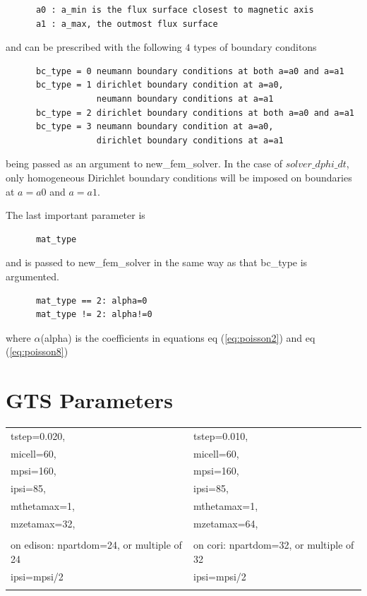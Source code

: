 \documentclass{report}
\begin{document}
\begin{verbatim}
      a0 : a_min is the flux surface closest to magnetic axis 
      a1 : a_max, the outmost flux surface 
\end{verbatim}

\noindent
and can be prescribed with the following $4$ types of boundary conditons

\begin{verbatim}
      bc_type = 0 neumann boundary conditions at both a=a0 and a=a1
      bc_type = 1 dirichlet boundary condition at a=a0,
                  neumann boundary conditions at a=a1
      bc_type = 2 dirichlet boundary conditions at both a=a0 and a=a1
      bc_type = 3 neumann boundary condition at a=a0,
                  dirichlet boundary conditions at a=a1
\end{verbatim}

\noindent
being passed as an argument to new\_fem\_solver.  
In the case of $solver\_dphi\_dt$,
only homogeneous Dirichlet boundary conditions will be imposed on boundaries
at $a=a0$ and $a=a1$.

The last important parameter is 

\begin{verbatim}
      mat_type
\end{verbatim}

\noindent
and is passed to new\_fem\_solver
in the same way as that bc\_type is argumented.

\begin{verbatim}
      mat_type == 2: alpha=0
      mat_type != 2: alpha!=0
\end{verbatim}

\noindent
where $\alpha$(alpha) is the coefficients in equations eq (\ref{eq:poisson2}) and eq (\ref{eq:poisson8})

 

\section{GTS Parameters}
\label{sec:para}
\begin{center}
\begin{tabular}{ |l|l| } 
 \hline
  tstep=0.020, &   tstep=0.010, \\ 
  micell=60, &   micell=60, \\ 
  mpsi=160, &   mpsi=160, \\ 
  ipsi=85, &   ipsi=85, \\ 
  mthetamax=1, &   mthetamax=1, \\ 
  mzetamax=32, &   mzetamax=64, \\ 
               &                \\
on edison: npartdom=24, or multiple of 24 &   on cori: npartdom=32, or multiple of 32 \\ 
  ipsi=mpsi/2  & ipsi=mpsi/2\\
& \\
 \hline
\end{tabular}
\end{center}
\\
\end{document}
